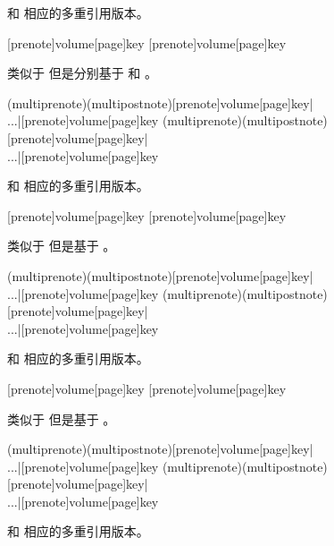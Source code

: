 \begin{ltxsyntax}
 和  相应的多重引用版本。

[prenote]{volume}[page]{key}
[prenote]{volume}[page]{key}

类似于  但是分别基于  和 。

(multiprenote)(multipostnote)[prenote]{volume}[page]{key}|\\...|[prenote]{volume}[page]{key}
(multiprenote)(multipostnote)[prenote]{volume}[page]{key}|\\...|[prenote]{volume}[page]{key}

 和  相应的多重引用版本。

[prenote]{volume}[page]{key}
[prenote]{volume}[page]{key}

类似于  但是基于 。

(multiprenote)(multipostnote)[prenote]{volume}[page]{key}|\\...|[prenote]{volume}[page]{key}
(multiprenote)(multipostnote)[prenote]{volume}[page]{key}|\\...|[prenote]{volume}[page]{key}

 和  相应的多重引用版本。

[prenote]{volume}[page]{key}
[prenote]{volume}[page]{key}

类似于  但是基于 。

(multiprenote)(multipostnote)[prenote]{volume}[page]{key}|\\...|[prenote]{volume}[page]{key}
(multiprenote)(multipostnote)[prenote]{volume}[page]{key}|\\...|[prenote]{volume}[page]{key}

 和  相应的多重引用版本。


\end{ltxsyntax}
